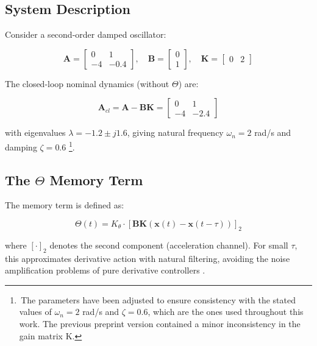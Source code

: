 \documentclass[12pt,a4paper]{article}
\begin{document}
\subsection{System Description}

Consider a second-order damped oscillator:

\begin{equation}
\mathbf{A} = \begin{bmatrix} 0 & 1 \\ -4 & -0.4 \end{bmatrix}, \quad
\mathbf{B} = \begin{bmatrix} 0 \\ 1 \end{bmatrix}, \quad
\mathbf{K} = \begin{bmatrix} 0 & 2 \end{bmatrix}
\label{eq:system}
\end{equation}

The closed-loop nominal dynamics (without $\Theta$) are:

\begin{equation}
\mathbf{A}_{cl} = \mathbf{A} - \mathbf{BK} = \begin{bmatrix} 0 & 1 \\ -4 & -2.4 \end{bmatrix}
\label{eq:acl}
\end{equation}

with eigenvalues $\lambda = -1.2 \pm j1.6$, giving natural frequency 
$\omega_n = 2$ rad/s and damping $\zeta = 0.6$\,\,\footnote{\,The parameters have been adjusted to ensure consistency with the stated values of $\omega_n = 2$ rad/s and $\zeta = 0.6$, which are the ones used throughout this work. The previous preprint version contained a minor inconsistency in the gain matrix K.}.

\subsection{The $\Theta$ Memory Term}

The memory term is defined as:

\begin{equation}
\Theta(t) = K_\theta \cdot \left[\mathbf{BK}(\mathbf{x}(t) - \mathbf{x}(t-\tau))\right]_2
\label{eq:theta_def}
\end{equation}

where $[\cdot]_2$ denotes the second component (acceleration channel). 
For small $\tau$, this approximates derivative action with natural 
filtering, avoiding the noise amplification problems of pure 
derivative controllers \citep{Gu2003}.
\end{document}
